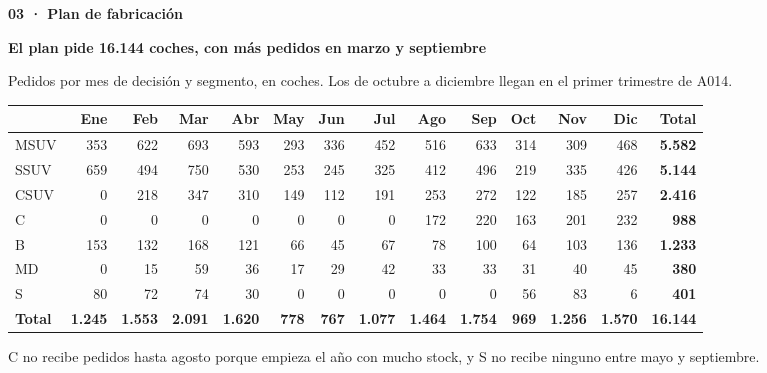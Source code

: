 \documentclass[aspectratio=169,10pt]{beamer}
\renewcommand{\arraystretch}{1.18}
\newcommand{\serif}{\bfseries}
\newcommand{\cab}[3]{%
  \vspace*{0mm}\hyphenpenalty=10000 \exhyphenpenalty=10000 \raggedright
  {\footnotesize\bfseries\color{sec}#1}\par\vspace{2mm}
  {\serif\fontsize{17}{20}\selectfont\color{tinta}#2\par}\vspace{1.5mm}
  {\small\color{sec}#3\par}\vspace{4mm}}
\begin{document}
\begin{frame}[t]
\cab{03 · Plan de fabricación}{El plan pide 16.144 coches, con más pedidos en marzo y septiembre}{Pedidos por mes de decisión y segmento, en coches. Los de octubre a diciembre llegan en el primer trimestre de A014.}
{\fontsize{7.5}{9}\selectfont\setlength{\tabcolsep}{3.3pt}\renewcommand{\arraystretch}{1.02}
\begin{tabular*}{\linewidth}{@{\extracolsep{\fill}}lrrrrrrrrrrrrr@{}}
\toprule
 & Ene & Feb & Mar & Abr & May & Jun & Jul & Ago & Sep & Oct & Nov & Dic & \textbf{Total}\\
\midrule
MSUV & 353 & 622 & 693 & 593 & 293 & 336 & 452 & 516 & 633 & 314 & 309 & 468 & \textbf{5.582}\\
SSUV & 659 & 494 & 750 & 530 & 253 & 245 & 325 & 412 & 496 & 219 & 335 & 426 & \textbf{5.144}\\
CSUV & 0 & 218 & 347 & 310 & 149 & 112 & 191 & 253 & 272 & 122 & 185 & 257 & \textbf{2.416}\\
C & 0 & 0 & 0 & 0 & 0 & 0 & 0 & 172 & 220 & 163 & 201 & 232 & \textbf{988}\\
B & 153 & 132 & 168 & 121 & 66 & 45 & 67 & 78 & 100 & 64 & 103 & 136 & \textbf{1.233}\\
MD & 0 & 15 & 59 & 36 & 17 & 29 & 42 & 33 & 33 & 31 & 40 & 45 & \textbf{380}\\
S & 80 & 72 & 74 & 30 & 0 & 0 & 0 & 0 & 0 & 56 & 83 & 6 & \textbf{401}\\
\midrule
\textbf{Total} & \textbf{1.245} & \textbf{1.553} & \textbf{2.091} & \textbf{1.620} & \textbf{778} & \textbf{767} & \textbf{1.077} & \textbf{1.464} & \textbf{1.754} & \textbf{969} & \textbf{1.256} & \textbf{1.570} & \textbf{16.144}\\
\bottomrule
\end{tabular*}}
\par\vspace{2.5mm}
{\footnotesize\color{sec}C no recibe pedidos hasta agosto porque empieza el año con mucho stock, y S no recibe ninguno entre mayo y septiembre.}
\end{frame}
\end{document}
